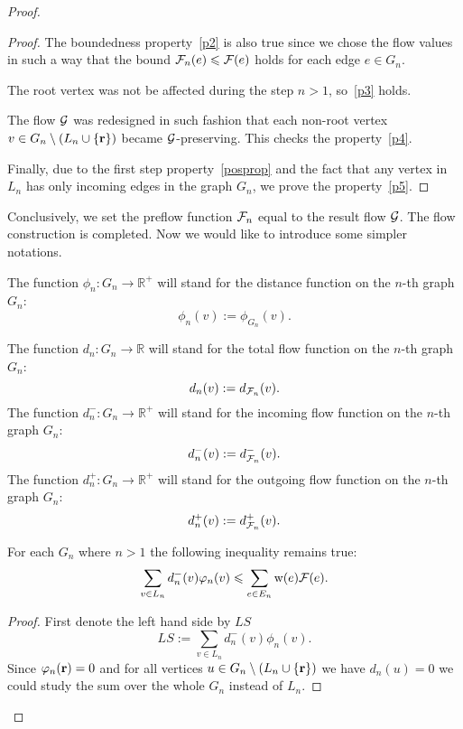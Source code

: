 \documentclass[12pt]{article}
\begin{document}
\begin{proof}
\begin{proof}
        The boundedness property~\ref{p2} is also true since we chose the flow values in such a way
          that the bound $\flowposn{n}(e) \leq \flowpos(e)$ holds for each edge $e\in G_n$.

        The root vertex was not be affected during the step $n > 1$, so~\ref{p3} holds.

        The flow $\cal{G}$ was redesigned in such fashion that each non-root vertex $v \in G_{n} \setminus 
          \left(L_n \cup \{\root\}\right)$ became $\cal{G}$-preserving.
        This checks the property~\ref{p4}.

        Finally, due to the first step property~\ref{posprop} and the fact that
        any vertex in $L_n$ has only incoming edges in the graph $G_n$, we prove the property~\ref{p5}.
      \end{proof}
      Conclusively, we set the preflow function $\flowposn{n}$ equal to the result flow $\cal{G}$.
      The flow construction is completed.
      Now we would like to introduce some simpler notations.
      \begin{definition}
        The function $\phi_n: G_n \to \mathbb{R}^{+}$ will stand for the distance function on the $n$-th graph $G_n$:
        \[
          \phi_n(v) := \phi_{G_n}(v).
        \]
      \end{definition}
      \begin{definition}
        The function $d_n: G_n \to \mathbb{R}$ will stand for the total flow function on the $n$-th graph $G_n$:
        \[
          d_n(v) := d_{\flowposn{n}}(v).
        \]
        The function $d^{-}_n: G_n \to \mathbb{R}^{+}$ will stand for the incoming flow function on the $n$-th graph $G_n$:
        \[
          d^{-}_n(v) := d^{-}_{\flowposn{n}}(v).
        \]
        The function $d^{+}_n: G_n \to \mathbb{R}^{+}$ will stand for the outgoing flow function on the $n$-th graph $G_n$:
        \[
          d^{+}_n(v) := d^{+}_{\flowposn{n}}(v).
        \]
      \end{definition}
      \begin{lemma}
        For each $G_n$ where $n > 1$ the following inequality remains true:
        \begin{equation}
          \label{main-ineq}
          \sum_{v\in L_n}d_{n}^{-}(v) \phi_n(v) \leq \sum_{e \in E_n} \wtp(e) \flowpos(e).
        \end{equation}
      \end{lemma}
      \begin{proof}
        First denote the left hand side by $LS$
        \[
          LS := \sum\limits_{v \in L_n} d_n^{-}(v) \phi_n(v).
        \]
        Since $\phi_n(\root) = 0$ and for all vertices $u \in G_{n} \setminus \left(L_n \cup \{\root\}\right)$
          we have $d_n(u) = 0$ we could study the sum over the whole $G_n$ instead of $L_n$.


\end{proof}
\end{proof}
\end{document}
